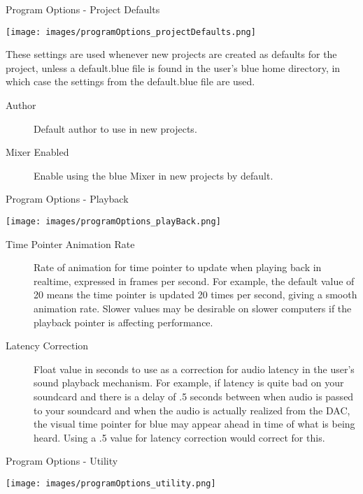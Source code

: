Program Options - Project Defaults

\texttt{[image: images/programOptions\_projectDefaults.png]}

These settings are used whenever new projects are created as defaults
for the project, unless a default.blue file is found in the user's blue
home directory, in which case the settings from the default.blue file
are used.

\begin{description}
\item[Author]
Default author to use in new projects.
\item[Mixer Enabled]
Enable using the blue Mixer in new projects by default.
\end{description}

Program Options - Playback

\texttt{[image: images/programOptions\_playBack.png]}

\begin{description}
\item[Time Pointer Animation Rate]
Rate of animation for time pointer to update when playing back in
realtime, expressed in frames per second. For example, the default value
of 20 means the time pointer is updated 20 times per second, giving a
smooth animation rate. Slower values may be desirable on slower
computers if the playback pointer is affecting performance.
\item[Latency Correction]
Float value in seconds to use as a correction for audio latency in the
user's sound playback mechanism. For example, if latency is quite bad on
your soundcard and there is a delay of .5 seconds between when audio is
passed to your soundcard and when the audio is actually realized from
the DAC, the visual time pointer for blue may appear ahead in time of
what is being heard. Using a .5 value for latency correction would
correct for this.
\end{description}

Program Options - Utility

\texttt{[image: images/programOptions\_utility.png]}

